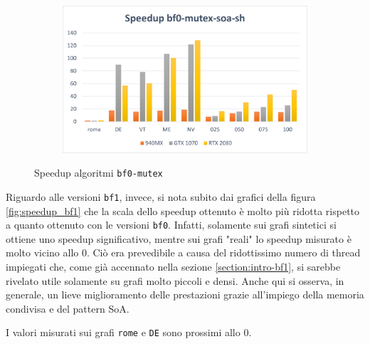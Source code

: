 \documentclass[12pt,a4paper,oneside]{book}
\begin{document}
\begin{figure}[b]
\begin{subfigure}{.5\textwidth}
		\end{subfigure}%
		\begin{subfigure}{.5\textwidth}
			\centering
			\includegraphics[width=\textwidth]{speedup_bf0-mutex-soa-sh}
		\end{subfigure}
		\caption{Speedup algoritmi \texttt{bf0-mutex}}
		\label{fig:speedup_bf0-mutex}
	\end{figure}

	Riguardo alle versioni \texttt{bf1}, invece, si nota subito dai grafici della figura \ref{fig:speedup_bf1} che la scala dello speedup ottenuto è molto più ridotta rispetto a quanto ottenuto con le versioni \texttt{bf0}. Infatti, solamente sui grafi sintetici si ottiene uno speedup significativo, mentre sui grafi "reali" lo speedup misurato è molto vicino allo $0$. Ciò era prevedibile a causa del ridottissimo numero di thread impiegati che, come già accennato nella sezione \ref{section:intro-bf1}, si sarebbe rivelato utile solamente su grafi molto piccoli e densi. Anche qui si osserva, in generale, un lieve miglioramento delle prestazioni grazie all'impiego della memoria condivisa e del pattern SoA.
	
	I valori misurati sui grafi \texttt{rome} e \texttt{DE} sono prossimi allo $0$.
\end{document}
